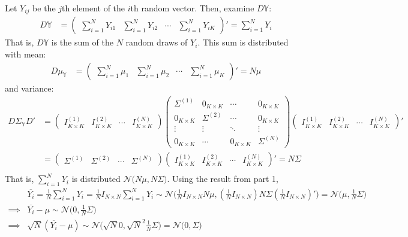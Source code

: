 \documentclass{article}[12pt]
\begin{document}
\begin{enumerate}
	Let $Y_{ij}$ be the $j$th element of the $i$th random vector. Then, examine $D \mathbb{Y}$:
	\begin{align*}
		D \mathbb{Y} &= \begin{pmatrix} \sum_{i=1}^N Y_{i1} & \sum_{i=1}^N Y_{i2} & \cdots & \sum_{i=1}^N Y_{iK} \end{pmatrix}' = \sum_{i=1}^N Y_i
	\end{align*}
	That is, $D \mathbb{Y}$ is the sum of the $N$ random draws of $Y_i$. This sum is distributed with mean:
	\begin{align*}
		D \mu_{\mathbb{Y}} &= \begin{pmatrix} \sum_{i=1}^N \mu_1 & \sum_{i=1}^N \mu_2 & \cdots & \sum_{i=1}^N \mu_K \end{pmatrix}' = N \mu
	\end{align*}
	and variance:
	\begin{align*}
		D \Sigma_{\mathbb{Y}} D' &=
			\begin{pmatrix} I_{K \times K} ^{(1)} & I_{K \times K} ^{(2)} & \cdots & I_{K \times K} ^{(N)} \end{pmatrix}
			\begin{pmatrix}
				\Sigma^{(1)} & 0_{K \times K} & \cdots & 0_{K \times K} \\
				0_{K \times K} & \Sigma^{(2)} & \cdots & 0_{K \times K} \\
				\vdots & \vdots & \ddots & \vdots \\
				0_{K \times K} & \cdots & 0_{K \times K} & \Sigma^{(N)}
			\end{pmatrix}
			\begin{pmatrix} I_{K \times K} ^{(1)} & I_{K \times K} ^{(2)} & \cdots & I_{K \times K} ^{(N)}  \end{pmatrix}' \\
		&= \begin{pmatrix} \Sigma^{(1)} & \Sigma^{(2)} & \cdots & \Sigma^{(N)} \end{pmatrix} \begin{pmatrix} I_{K \times K} ^{(1)} & I_{K \times K} ^{(2)} & \cdots & I_{K \times K} ^{(N)}  \end{pmatrix}' = N \Sigma\\
	\end{align*}
	That is, $\sum_{i=1}^N Y_i$ is distributed $\mathscr{N}\bigg( N\mu , N\Sigma \bigg)$. Using the result from part 1,
	\begin{align*}
		& \overline{Y_i} = \frac{1}{N} \sum_{i=1}^N Y_i = \frac{1}{N} I_{N \times N} \sum_{i=1}^N Y_i
			\sim \mathscr{N}\bigg( \frac{1}{N} I_{N \times N} N\mu , (\frac{1}{N} I_{N \times N}) N\Sigma (\frac{1}{N} I_{N \times N})' \bigg) = \mathscr{N}\bigg( \mu , \frac{1}{N} \Sigma \bigg) \\
		\implies & \overline{Y_i} - \mu \sim \mathscr{N}\bigg(0, \frac{1}{N} \Sigma \bigg) \\
		\implies & \sqrt{N} (\overline{Y_i} - \mu) \sim \mathscr{N}\bigg( \sqrt{N} 0, \sqrt{N}^2 \frac{1}{N} \Sigma \bigg) = \mathscr{N}\bigg( 0, \Sigma \bigg)
	\end{align*}


\end{enumerate}
\end{document}
